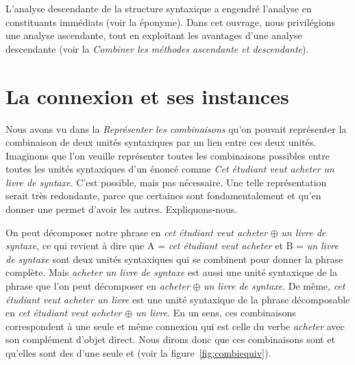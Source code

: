 \begin{sloppypar}
L’analyse descendante de la structure syntaxique a engendré l’analyse en constituants immédiats (voir la  éponyme). Dans cet ouvrage, nous privilégions une analyse ascendante, tout en exploitant les avantages d’une analyse descendante (voir la  \textit{Combiner les méthodes ascendante et descendante}).
\end{sloppypar}

\section{La connexion et ses instances}\label{sec:3.2.14}

Nous avons vu dans la  \textit{Représenter les combinaisons} qu'on pouvait représenter la combinaison de deux unités syntaxiques par un lien entre ces deux unités. Imaginons que l’on veuille représenter toutes les combinaisons possibles entre toutes les unités syntaxiques d’un énoncé comme \textit{Cet étudiant veut acheter un livre de syntaxe}. C’est possible, mais pas nécessaire. Une telle représentation serait très redondante, parce que certaines  sont fondamentalement  et qu’en donner une permet d’avoir les autres. Expliquons-nous.

On peut décomposer notre phrase en \textit{cet étudiant veut acheter} ${\oplus}$ \textit{un livre de syntaxe}, ce qui revient à dire que A = \textit{cet étudiant veut acheter} et B = \textit{un livre de syntaxe} sont deux unités syntaxiques qui se combinent pour donner la phrase complète. Mais \textit{acheter un livre de syntaxe} est aussi une unité syntaxique de la phrase que l’on peut décomposer en \textit{acheter} ${\oplus}$ \textit{un livre de syntaxe}. De même, \textit{cet étudiant veut acheter un livre} est une unité syntaxique de la phrase décomposable en \textit{cet étudiant veut acheter} ${\oplus}$ \textit{un livre}. En un sens, ces combinaisons correspondent à une seule et même connexion qui est celle du verbe \textit{acheter} avec son complément d’objet direct. Nous dirons donc que ces combinaisons sont  et qu’elles sont des  d’une seule et  (voir la figure~\ref{fig:combiequiv}). 

